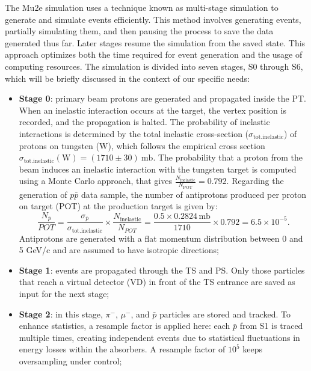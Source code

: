 The Mu2e simulation uses a technique 
known as multi-stage simulation 
to generate and simulate events efficiently. 
This method involves generating 
events, partially simulating them, and then 
pausing the process to save the 
data generated thus far. Later stages resume 
the simulation from the saved 
state. This approach optimizes both the 
time required for event generation 
and the usage of computing resources. The 
simulation is divided into seven 
stages, S0 through S6, which will be 
briefly discussed in the context of our specific needs:

\begin{itemize}
    \item \textbf{Stage 0}: primary beam protons are generated and propagated 
    inside the PT. When an inelastic interaction occurs at the target, the vertex 
    position is recorded, and the propagation is halted. The probability of 
    inelastic interactions is determined by the total inelastic cross-section 
    ($\sigma_{\text{tot.inelastic}}$) of protons on tungsten (W), which follows the 
    empirical cross section $\sigma_{\text{tot.inelastic}}(\text{W}) = (1710 \pm 30) \ \text{mb}$.
    The probability that a proton from the beam induces an inelastic interaction 
    with the tungsten target is computed using a Monte Carlo approach, that gives 
    $\frac{N_{\text{inelastic}}}{N_{\text{POT}}} = 0.792$. Regarding the generation of $p\bar{p}$ 
    data sample, the number of antiprotons produced per proton on target (POT) at the production target is given by:
    $$
    \frac{N_{\bar{p}}}{POT} = \frac{\sigma_{\bar{p}}}{\sigma_{\text{tot.inelastic}}} \times \frac{N_{\text{inelastic}}}{N_{POT}} = \frac{0.5 \times 0.2824 \, \text{mb}}{1710} \times 0.792 = 6.5 \times 10^{-5}.
    $$
    Antiprotons are generated with a flat momentum distribution between 0 and 5 GeV/c and 
    are assumed to have isotropic directions;
    
    \item \textbf{Stage 1}: events are propagated through the TS and PS. 
    Only those particles that reach a virtual detector (VD) in front 
    of the TS entrance are saved as input for the next stage;

    \item \textbf{Stage 2}: in this stage, $\pi^-$, $\mu^-$, and $\bar{p}$ 
    particles are stored and tracked. To enhance statistics, a resample factor 
    is applied here: each $\bar{p}$ from S1 is traced multiple times, creating 
    independent events due to statistical fluctuations in energy losses within 
    the absorbers. A resample factor of $10^5$ keeps oversampling under control;


\end{itemize}
